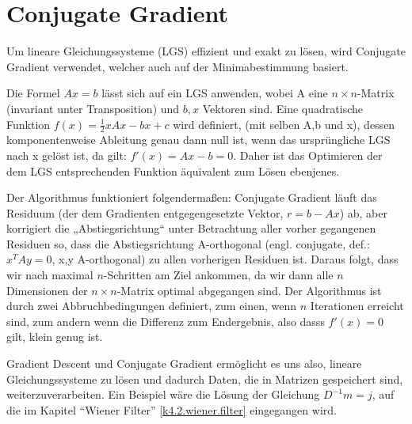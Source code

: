 
\section{Conjugate Gradient}

Um lineare Gleichungssysteme (LGS) effizient und exakt zu lösen, wird Conjugate Gradient verwendet, welcher auch auf der Minimabestimmung basiert.


Die Formel $Ax = b$ lässt sich auf ein LGS anwenden, wobei A eine $ n \times n $-Matrix (invariant unter Transposition) und $ b,x $ Vektoren sind. Eine quadratische Funktion $ f(x) = \frac{1}{2}xAx-bx+c $ wird definiert, (mit selben A,b und x), dessen komponentenweise Ableitung genau dann null ist, wenn das ursprüngliche LGS nach x gelöst ist, da gilt: $f'(x) = Ax-b = 0$. Daher ist das Optimieren der dem LGS entsprechenden Funktion äquivalent zum Lösen ebenjenes.


Der Algorithmus funktioniert folgendermaßen: Conjugate Gradient läuft das Residuum (der dem Gradienten entgegengesetzte Vektor, $ r = b-Ax $) ab, aber korrigiert die „Abstiegsrichtung“ unter Betrachtung aller vorher gegangenen Residuen so, dass die Abstiegsrichtung A-orthogonal (engl. conjugate, def.: $x^{T}Ay = 0$, x,y A-orthogonal) zu allen vorherigen Residuen ist. Daraus folgt, dass wir nach maximal $n$-Schritten am Ziel ankommen, da wir dann alle $n$ Dimensionen der $ n \times n $-Matrix optimal abgegangen sind. Der Algorithmus ist durch zwei Abbruchbedingungen definiert, zum einen, wenn $n$ Iterationen erreicht sind, zum andern wenn die Differenz zum Endergebnis, also dasss $ f'(x) = 0 $ gilt, klein genug ist.

Gradient Descent und Conjugate Gradient ermöglicht es uns also, lineare Gleichungssysteme zu lösen und dadurch Daten, die in Matrizen gespeichert sind, weiterzuverarbeiten. Ein Beispiel wäre die Lösung der Gleichung $ D^{-1} m = j $, auf die im Kapitel \enquote{Wiener Filter} \cref{k4.2.wiener.filter} eingegangen wird.
